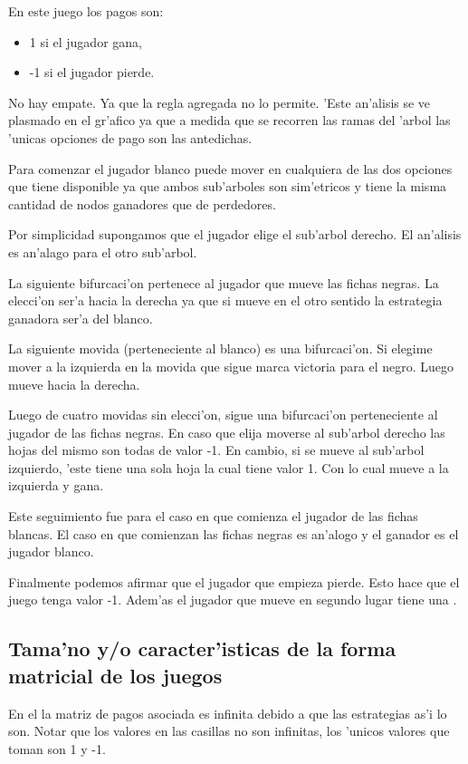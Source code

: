En este juego los pagos son:
\begin{itemize}
\item 1 si el jugador gana,
\item -1 si el jugador pierde.
\end{itemize}

No hay empate. Ya que la regla agregada no lo permite. 'Este an'alisis se ve plasmado en el gr'afico ya que a medida que se recorren las ramas del 'arbol las 'unicas opciones de pago son las antedichas.

Para comenzar el jugador blanco puede mover en cualquiera de las dos opciones que tiene disponible ya que ambos sub'arboles son sim'etricos y tiene la misma cantidad de nodos ganadores que de perdedores.

Por simplicidad supongamos que el jugador elige el sub'arbol derecho. El an'alisis es an'alago para el otro sub'arbol.

La siguiente bifurcaci'on pertenece al jugador que mueve las fichas negras. La elecci'on ser'a hacia la derecha ya que si mueve en el otro sentido la estrategia ganadora ser'a del blanco.

La siguiente movida (perteneciente al blanco) es una bifurcaci'on. Si elegime mover a la izquierda en la movida que sigue marca victoria para el negro. Luego mueve hacia la derecha.

Luego de cuatro movidas sin elecci'on, sigue una bifurcaci'on perteneciente al jugador de las fichas negras. En caso que elija moverse al sub'arbol derecho las hojas del mismo son todas de valor -1. En cambio, si se mueve al sub'arbol izquierdo, 'este tiene una sola hoja la cual tiene valor 1. Con lo cual mueve a la izquierda y gana.

Este seguimiento fue para el caso en que comienza el jugador de las fichas blancas. El caso en que comienzan las fichas negras es an'alogo y el ganador es el jugador blanco.

Finalmente podemos afirmar que el jugador que empieza pierde. Esto hace que el juego tenga valor -1. Adem'as el jugador que mueve en segundo lugar tiene una .

\subsection{Tama'no y/o caracter'isticas de la forma matricial de los juegos}

En el  la matriz de pagos asociada es infinita debido a que las estrategias as'i lo son. Notar que los valores en las casillas no son infinitas, los 'unicos valores que toman son 1 y -1.

